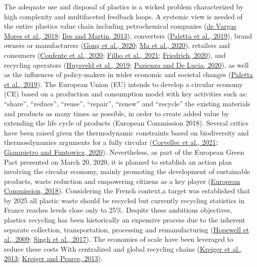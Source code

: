 \documentclass[]{elsarticle} %
\begin{document}
The adequate use and disposal of plastics is a wicked problem characterized by high complexity and multifaceted feedback loops.
A systemic view is needed of the entire plastics value chain including petrochemical companies (\protect\hyperlink{ref-DeVargasMores2018}{de Vargas Mores et al., 2018}; \protect\hyperlink{ref-Iles2013}{Iles and Martin, 2013}), converters (\protect\hyperlink{ref-Paletta2019}{Paletta et al., 2019}), brand owners or manufacturers (\protect\hyperlink{ref-Gong2020}{Gong et al., 2020}; \protect\hyperlink{ref-Ma2020}{Ma et al., 2020}), retailers and consumers (\protect\hyperlink{ref-Confente2020}{Confente et al., 2020}; \protect\hyperlink{ref-Filho2021}{Filho et al., 2021}; \protect\hyperlink{ref-Friedrich2020}{Friedrich, 2020}), and recycling operators (\protect\hyperlink{ref-Huysveld2019}{Huysveld et al., 2019}; \protect\hyperlink{ref-Pazienza2020}{Pazienza and De Lucia, 2020}), as well as the influences of policy-makers in wider economic and societal changes (\protect\hyperlink{ref-Paletta2019}{Paletta et al., 2019}).
The European Union (EU) intends to develop a circular economy (CE) based on a production and consumption model with key activities such as: ``share'', ``reduce'', ``reuse'', ``repair'', ``renew'' and ``recycle'' the existing materials and products as many times as possible, in order to create added value by extending the life cycle of products (European Commission 2018).
Several critics have been raised given the thermodynamic constraints based on biodiversity and thermosdynamics arguments for a fully circular (\protect\hyperlink{ref-corvellec2021}{Corvellec et al., 2021}; \protect\hyperlink{ref-Giampietro2020}{Giampietro and Funtowicz, 2020}).
Nevertheless, as part of the European Green Pact presented on March 20, 2020, it is planned to establish an action plan involving the circular economy, mainly promoting the development of sustainable products, waste reduction and empowering citizens as a key player (\protect\hyperlink{ref-EC2018}{European Commission, 2018}).
Considering the French context,a target was established that by 2025 all plastic waste should be recycled but currently recycling statistics in France reaches levels close only to 25\%.
Despite these ambitious objectives, plastics recycling has been historically an expensive process due to the inherent separate collection, transportation, processing and remanufacturing (\protect\hyperlink{ref-Hopewell2009}{Hopewell et al., 2009}; \protect\hyperlink{ref-Singh2017b}{Singh et al., 2017}).
The economies of scale have been leveraged to reduce these costs With centralized and global recycling chains (\protect\hyperlink{ref-Anzalone2013}{Kreiger et al., 2013}; \protect\hyperlink{ref-Kreiger2013}{Kreiger and Pearce, 2013}).
\end{document}
